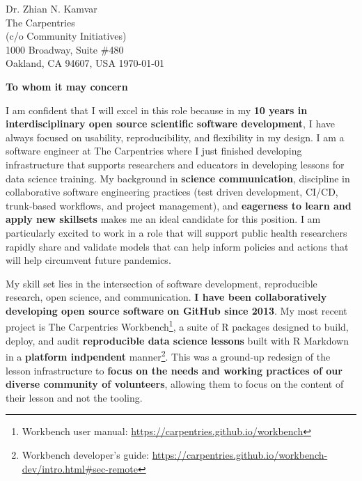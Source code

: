


\clearpage
\begin{flushright}
  Dr. Zhian N. Kamvar\\
  The Carpentries\\
  (c/o Community Initiatives)\\
  1000 Broadway, Suite \#480\\
  Oakland, CA 94607, USA
  \today
\end{flushright}

\textbf{To whom it may concern}

\vspace{2ex}

I am confident that I will excel in
this role because in my \textbf{10 years in interdisciplinary open source
scientific software development}, I have always focused on usability,
reproducibility, and flexibility in my design.
I am a software engineer at The Carpentries where I just finished developing
infrastructure that supports researchers and educators in developing lessons
for data science training. 
My background in \textbf{science communication}, discipline in collaborative
software engineering practices (test driven development, CI/CD, trunk-based
workflows, and project management), and \textbf{eagerness to learn and apply
new skillsets} makes me an ideal candidate for this position. 
I am particularly excited to work in a role that will support public health
researchers rapidly share and validate models that can help inform policies
and actions that will help circumvent future pandemics.

\vspace{2ex}

My skill set lies in the intersection of software development,
reproducible research, open science, and communication. 
\textbf{I have been collaboratively developing open source software on GitHub
since 2013}.
My most recent project is The Carpentries Workbench\footnote{Workbench user manual: \url{https://carpentries.github.io/workbench}}, 
a suite of R packages designed to build, deploy, and audit \textbf{reproducible
data science lessons} built with R Markdown in a \textbf{platform indpendent} manner\footnote{Workbench developer's guide: \url{https://carpentries.github.io/workbench-dev/intro.html\#sec-remote}}.
This was a ground-up redesign of the lesson infrastructure to \textbf{focus on
the needs and working practices of our diverse community of volunteers},
allowing them to focus on the content of their lesson and not the tooling.

